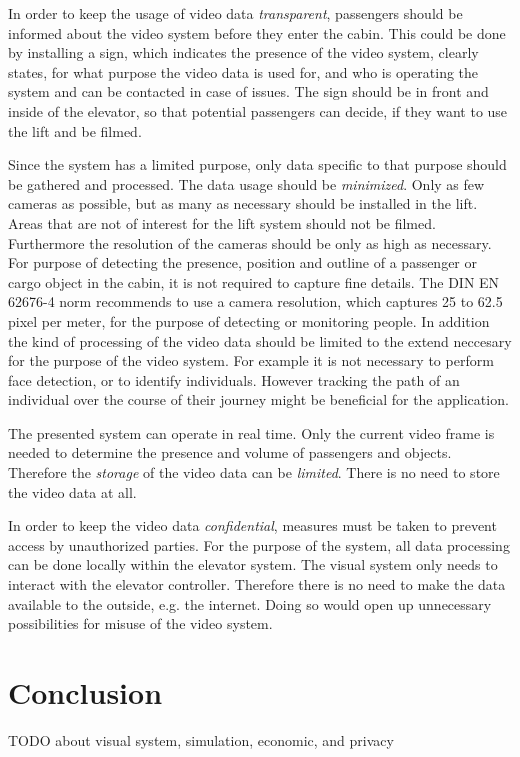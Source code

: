 In order to keep the usage of video data \emph{transparent},
passengers should be informed about the video system before they enter the cabin.
This could be done by installing a sign, which indicates the presence of the video system, 
clearly states, for what purpose the video data is used for, 
and who is operating the system and can be contacted in case of issues.
The sign should be in front and inside of the elevator, 
so that potential passengers can decide,
if they want to use the lift and be filmed.

Since the system has a limited purpose, 
only data specific to that purpose should be gathered and processed.
The data usage should be \emph{minimized}.
Only as few cameras as possible, but as many as necessary should be installed in the lift.
Areas that are not of interest for the lift system should not be filmed.
Furthermore the resolution of the cameras should be only as high as necessary.
For purpose of detecting the presence, position and outline of a passenger or cargo object 
in the cabin, it is not required to capture fine details.
The DIN EN 62676-4 norm \autocite[][]{din2016surveillance} recommends 
to use a camera resolution, which captures 25 to 62.5 pixel per meter,
for the purpose of detecting or monitoring people.
In addition the kind of processing of the video data should be limited to the extend neccesary for the purpose of the video system. 
For example it is not necessary to perform face detection, or to identify individuals.
However tracking the path of an individual over the course of their journey might be beneficial for the application.

The presented system can operate in real time.
Only the current video frame is needed to determine the presence and volume of passengers and objects.
Therefore the \emph{storage} of the video data can be \emph{limited}.
There is no need to store the video data at all.

In order to keep the video data \emph{confidential}, 
measures must be taken to prevent access by unauthorized parties.
For the purpose of the system, all data processing can be done locally within the elevator system.
The visual system only needs to interact with the elevator controller.
Therefore there is no need to make the data available to the outside, e.g. the internet.
Doing so would open up unnecessary possibilities for misuse of the video system.

\section{Conclusion}
TODO about visual system, simulation, economic, and privacy